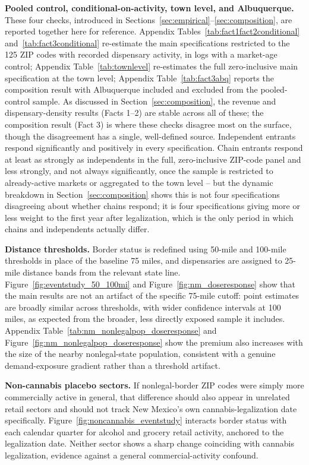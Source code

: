 \documentclass[english,12pt]{article}
\begin{document}
\textbf{Pooled control, conditional-on-activity, town level, and Albuquerque.} These four checks, introduced in Sections~\ref{sec:empirical}--\ref{sec:composition}, are reported together here for reference. Appendix Tables~\ref{tab:fact1fact2conditional} and~\ref{tab:fact3conditional} re-estimate the main specifications restricted to the 125 ZIP codes with recorded dispensary activity, in logs with a market-age control; Appendix Table~\ref{tab:townlevel} re-estimates the full zero-inclusive main specification at the town level; Appendix Table~\ref{tab:fact3abq} reports the composition result with Albuquerque included and excluded from the pooled-control sample. As discussed in Section~\ref{sec:composition}, the revenue and dispensary-density results (Facts 1--2) are stable across all of these; the composition result (Fact 3) is where these checks disagree most on the surface, though the disagreement has a single, well-defined source. Independent entrants respond significantly and positively in every specification. Chain entrants respond at least as strongly as independents in the full, zero-inclusive ZIP-code panel and less strongly, and not always significantly, once the sample is restricted to already-active markets or aggregated to the town level -- but the dynamic breakdown in Section~\ref{sec:composition} shows this is not four specifications disagreeing about whether chains respond; it is four specifications giving more or less weight to the first year after legalization, which is the only period in which chains and independents actually differ.

\textbf{Distance thresholds.} Border status is redefined using 50-mile and 100-mile thresholds in place of the baseline 75 miles, and dispensaries are assigned to 25-mile distance bands from the relevant state line. Figure~\ref{fig:eventstudy_50_100mi} and Figure~\ref{fig:nm_doseresponse} show that the main results are not an artifact of the specific 75-mile cutoff: point estimates are broadly similar across thresholds, with wider confidence intervals at 100 miles, as expected from the broader, less directly exposed sample it includes. Appendix Table~\ref{tab:nm_nonlegalpop_doseresponse} and Figure~\ref{fig:nm_nonlegalpop_doseresponse} show the premium also increases with the size of the nearby nonlegal-state population, consistent with a genuine demand-exposure gradient rather than a threshold artifact.

\textbf{Non-cannabis placebo sectors.} If nonlegal-border ZIP codes were simply more commercially active in general, that difference should also appear in unrelated retail sectors and should not track New Mexico's own cannabis-legalization date specifically. Figure~\ref{fig:noncannabis_eventstudy} interacts border status with each calendar quarter for alcohol and grocery retail activity, anchored to the legalization date. Neither sector shows a sharp change coinciding with cannabis legalization, evidence against a general commercial-activity confound.
\end{document}
